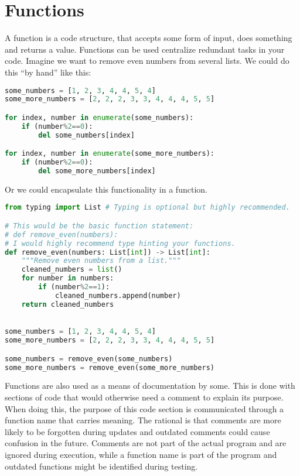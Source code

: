 \documentclass{article}
\newcommand{\qq}[1]{``#1''}
\begin{document}
\section{Functions}

A function is a code structure, that accepts some form of input, does something
and returns a value.
Functions can be used centralize redundant tasks in your code.
Imagine we want to remove even numbers from several lists.
We could do this \qq{by hand} like this:

\begin{lstlisting}[language=python]
some_numbers = [1, 2, 3, 4, 4, 5, 4]
some_more_numbers = [2, 2, 2, 3, 3, 4, 4, 4, 5, 5]

for index, number in enumerate(some_numbers):
    if (number%2==0):
        del some_numbers[index]

for index, number in enumerate(some_more_numbers):
    if (number%2==0):
        del some_more_numbers[index]
\end{lstlisting}

Or we could encapsulate this functionality in a function.

\begin{lstlisting}[language=python]
from typing import List # Typing is optional but highly recommended.

# This would be the basic function statement:
# def remove_even(numbers):
# I would highly recommend type hinting your functions.
def remove_even(numbers: List[int]) -> List[int]:
    """Remove even numbers from a list."""
    cleaned_numbers = list()
    for number in numbers:
        if (number%2==1):
            cleaned_numbers.append(number)
    return cleaned_numbers
    

some_numbers = [1, 2, 3, 4, 4, 5, 4]
some_more_numbers = [2, 2, 2, 3, 3, 4, 4, 4, 5, 5]

some_numbers = remove_even(some_numbers)
some_more_numbers = remove_even(some_more_numbers)
\end{lstlisting}

Functions are also used as a means of documentation by some.
This is done with sections of code that would otherwise need a comment
to explain its purpose.
When doing this, the purpose of this code section is communicated through a
function name that carries meaning.
The rational is that comments are more likely to be forgotten during updates and
outdated comments could cause confusion in the future.
Comments are not part of the actual program and are ignored during execution,
while a function name is part of the program and outdated functions might be
identified during testing.
\end{document}
